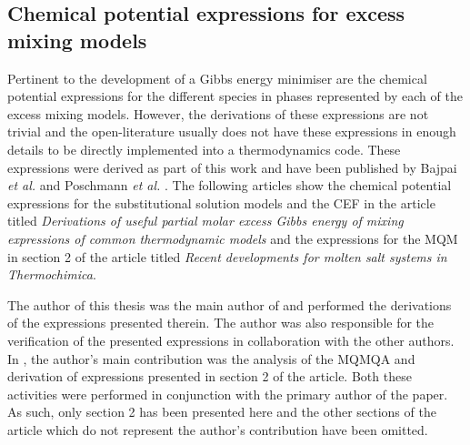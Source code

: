 	\subsection{Chemical potential expressions for excess mixing models}\label{sec:ChemPotExp}
	Pertinent to the development of a Gibbs energy minimiser are the chemical potential expressions for the different species in phases represented by each of the excess mixing models. However, the derivations of these expressions are not trivial and the open-literature usually does not have these expressions in enough details to be directly implemented into a thermodynamics code. These expressions were derived as part of this work and have been published by Bajpai \textit{et al.} \cite{Bajpai:2021aa} and Poschmann \textit{et al.} \cite{Poschmann:2021ab}. The following articles show the chemical potential expressions for the substitutional solution models and the CEF in the article titled \textit{Derivations of useful partial molar excess Gibbs energy of mixing expressions of common thermodynamic models} and the expressions for the MQM in section 2 of the article titled \textit{Recent developments for molten salt systems in Thermochimica}. 
	
	The author of this thesis was the main author of \cite{Bajpai:2021aa} and performed the derivations of the expressions presented therein. The author was also responsible for the verification  of the presented expressions in collaboration with the other authors. In \cite{Poschmann:2021ab}, the author's main contribution was the analysis of the MQMQA and derivation of expressions presented in section 2 of the article. Both these activities were performed in conjunction with the primary author of the paper. As such, only section 2 has been presented here and the other sections of the article which do not represent the author's contribution have been omitted.	
	
	
